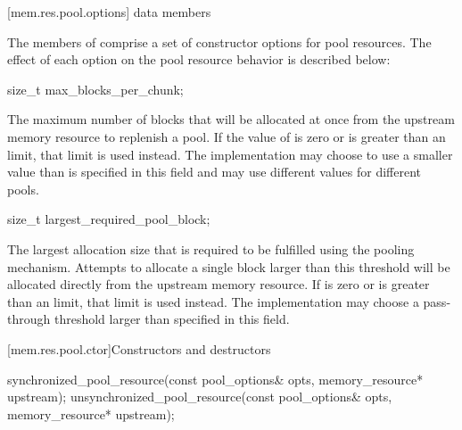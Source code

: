 [mem.res.pool.options]{ data members}

\pnum
The members of 
comprise a set of constructor options for pool resources.
The effect of each option on the pool resource behavior is described below:

%
\begin{itemdecl}
size_t max_blocks_per_chunk;
\end{itemdecl}

\begin{itemdescr}
\pnum
The maximum number of blocks that will be allocated at once
from the upstream memory resource
to replenish a pool.
If the value of  is zero or
is greater than an 
limit, that limit is used instead.
The implementation
may choose to use a smaller value than is specified in this field and
may use different values for different pools.
\end{itemdescr}

%
\begin{itemdecl}
size_t largest_required_pool_block;
\end{itemdecl}

\begin{itemdescr}
\pnum
The largest allocation size that is required to be fulfilled
using the pooling mechanism.
Attempts to allocate a single block larger than this threshold
will be allocated directly from the upstream memory resource.
If  is zero or
is greater than an 
limit, that limit is used instead.
The implementation may choose a pass-through threshold
larger than specified in this field.
\end{itemdescr}

[mem.res.pool.ctor]{Constructors and destructors}

%
%
\begin{itemdecl}
synchronized_pool_resource(const pool_options& opts, memory_resource* upstream);
unsynchronized_pool_resource(const pool_options& opts, memory_resource* upstream);
\end{itemdecl}

